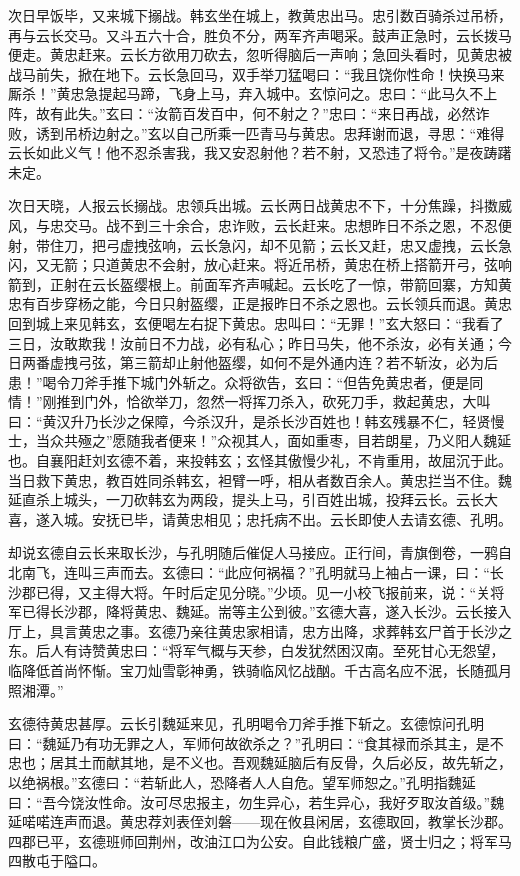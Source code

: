 次日早饭毕，又来城下搦战。韩玄坐在城上，教黄忠出马。忠引数百骑杀过吊桥，再与云长交马。又斗五六十合，胜负不分，两军齐声喝采。鼓声正急时，云长拨马便走。黄忠赶来。云长方欲用刀砍去，忽听得脑后一声响；急回头看时，见黄忠被战马前失，掀在地下。云长急回马，双手举刀猛喝曰：“我且饶你性命！快换马来厮杀！”黄忠急提起马蹄，飞身上马，弃入城中。玄惊问之。忠曰：“此马久不上阵，故有此失。”玄曰：“汝箭百发百中，何不射之？”忠曰：“来日再战，必然诈败，诱到吊桥边射之。”玄以自己所乘一匹青马与黄忠。忠拜谢而退，寻思：“难得云长如此义气！他不忍杀害我，我又安忍射他？若不射，又恐违了将令。”是夜踌躇未定。

次日天晓，人报云长搦战。忠领兵出城。云长两日战黄忠不下，十分焦躁，抖擞威风，与忠交马。战不到三十余合，忠诈败，云长赶来。忠想昨日不杀之恩，不忍便射，带住刀，把弓虚拽弦响，云长急闪，却不见箭；云长又赶，忠又虚拽，云长急闪，又无箭；只道黄忠不会射，放心赶来。将近吊桥，黄忠在桥上搭箭开弓，弦响箭到，正射在云长盔缨根上。前面军齐声喊起。云长吃了一惊，带箭回寨，方知黄忠有百步穿杨之能，今日只射盔缨，正是报昨日不杀之恩也。云长领兵而退。黄忠回到城上来见韩玄，玄便喝左右捉下黄忠。忠叫曰：“无罪！”玄大怒曰：“我看了三日，汝敢欺我！汝前日不力战，必有私心；昨日马失，他不杀汝，必有关通；今日两番虚拽弓弦，第三箭却止射他盔缨，如何不是外通内连？若不斩汝，必为后患！”喝令刀斧手推下城门外斩之。众将欲告，玄曰：“但告免黄忠者，便是同情！”刚推到门外，恰欲举刀，忽然一将挥刀杀入，砍死刀手，救起黄忠，大叫曰：“黄汉升乃长沙之保障，今杀汉升，是杀长沙百姓也！韩玄残暴不仁，轻贤慢士，当众共殛之”愿随我者便来！”众视其人，面如重枣，目若朗星，乃义阳人魏延也。自襄阳赶刘玄德不着，来投韩玄；玄怪其傲慢少礼，不肯重用，故屈沉于此。当日救下黄忠，教百姓同杀韩玄，袒臂一呼，相从者数百余人。黄忠拦当不住。魏延直杀上城头，一刀砍韩玄为两段，提头上马，引百姓出城，投拜云长。云长大喜，遂入城。安抚已毕，请黄忠相见；忠托病不出。云长即使人去请玄德、孔明。

却说玄德自云长来取长沙，与孔明随后催促人马接应。正行间，青旗倒卷，一鸦自北南飞，连叫三声而去。玄德曰：“此应何祸福？”孔明就马上袖占一课，曰：“长沙郡已得，又主得大将。午时后定见分晓。”少顷。见一小校飞报前来，说：“关将军已得长沙郡，降将黄忠、魏延。耑等主公到彼。”玄德大喜，遂入长沙。云长接入厅上，具言黄忠之事。玄德乃亲往黄忠家相请，忠方出降，求葬韩玄尸首于长沙之东。后人有诗赞黄忠曰：“将军气概与天参，白发犹然困汉南。至死甘心无怨望，临降低首尚怀惭。宝刀灿雪彰神勇，铁骑临风忆战酗。千古高名应不泯，长随孤月照湘潭。”

玄德待黄忠甚厚。云长引魏延来见，孔明喝令刀斧手推下斩之。玄德惊问孔明曰：“魏延乃有功无罪之人，军师何故欲杀之？”孔明曰：“食其禄而杀其主，是不忠也；居其土而献其地，是不义也。吾观魏延脑后有反骨，久后必反，故先斩之，以绝祸根。”玄德曰：“若斩此人，恐降者人人自危。望军师恕之。”孔明指魏延曰：“吾今饶汝性命。汝可尽忠报主，勿生异心，若生异心，我好歹取汝首级。”魏延喏喏连声而退。黄忠荐刘表侄刘磐——现在攸县闲居，玄德取回，教掌长沙郡。四郡已平，玄德班师回荆州，改油江口为公安。自此钱粮广盛，贤士归之；将军马四散屯于隘口。


